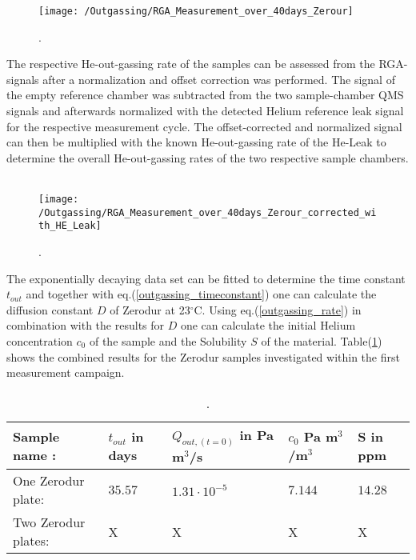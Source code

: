 \begin{figure}[H]
	\centering
	\texttt{[image: /Outgassing/RGA\_Measurement\_over\_40days\_Zerour]}
	\caption{.}
	\label{fig:outgassing_Raw_data_outgassing_Zerodur}
\end{figure}

The respective He-out-gassing rate of the samples can be assessed from the RGA-signals after a normalization and offset correction was performed. The signal of the empty reference chamber was subtracted from the two sample-chamber QMS signals and afterwards normalized with the detected Helium reference leak signal for the respective measurement cycle. The offset-corrected and normalized signal can then be multiplied with the known He-out-gassing rate of the He-Leak to determine the overall He-out-gassing rates of the two respective sample chambers. \\\\
\noindent
\begin{figure}[H]
	\centering
	\texttt{[image: /Outgassing/RGA\_Measurement\_over\_40days\_Zerour\_corrected\_with\_HE\_Leak]}
	\caption{.}
	\label{fig:outgassing_result_one_and_two_Zerodur_samples}
\end{figure}

The exponentially decaying data set can be fitted to determine the time constant $t_{out}$ and together with eq.(\ref{outgassing_timeconstant}) one can calculate the diffusion constant $D$ of Zerodur at 23$^\circ$C. Using eq.(\ref{outgassing_rate}) in combination with the results for $D$ one can calculate the initial Helium concentration $c_0$ of the sample and the Solubility $S$ of the material. Table(\ref{table:results_outgassing}) shows the combined results for the Zerodur samples investigated within the first measurement campaign.

\begin{table}[H]
	\begin{center}
		\begin{tabular}{ lllll }
			\toprule
			Sample name : & $t_{out}$ in days  &$Q_{out,(t=0)}$ in Pa m$^3$/s & $c_0$ Pa m$^3$/m$^3$ & S in ppm \\
			\midrule
			One Zerodur plate: &$35.57$& $1.31 \cdot 10^{-5}$& $7.144$ &  $14.28$\\
			Two Zerodur plates: &X&X&X&X\\
			\bottomrule
		\end{tabular}
	\end{center}
	\caption{.}
	\label{table:results_outgassing}
\end{table}
